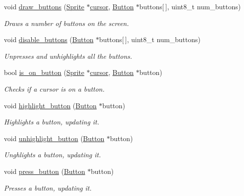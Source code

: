 \begin{DoxyCompactItemize}
void \mbox{\hyperlink{group__sprite_ga73cc8ddf6dbcb83935fabd2443251edd}{draw\+\_\+buttons}} (\mbox{\hyperlink{struct_sprite}{Sprite}} $\ast$\mbox{\hyperlink{pengoo_8c_a3a7ea4305773abf5347bb261a8a5c16b}{cursor}}, \mbox{\hyperlink{struct_button}{Button}} $\ast$buttons\mbox{[}$\,$\mbox{]}, uint8\+\_\+t num\+\_\+buttons)
\begin{DoxyCompactList}\small\item\em Draws a number of buttons on the screen. \end{DoxyCompactList}\item 
void \mbox{\hyperlink{group__sprite_ga7438e498241a820e8b1f4ab63e42c99b}{disable\+\_\+buttons}} (\mbox{\hyperlink{struct_button}{Button}} $\ast$buttons\mbox{[}$\,$\mbox{]}, uint8\+\_\+t num\+\_\+buttons)
\begin{DoxyCompactList}\small\item\em Unpresses and unhighlights all the buttons. \end{DoxyCompactList}\item 
bool \mbox{\hyperlink{group__sprite_ga8fe18a5b062a81b4b99dc62f0643446c}{is\+\_\+on\+\_\+button}} (\mbox{\hyperlink{struct_sprite}{Sprite}} $\ast$\mbox{\hyperlink{pengoo_8c_a3a7ea4305773abf5347bb261a8a5c16b}{cursor}}, \mbox{\hyperlink{struct_button}{Button}} $\ast$button)
\begin{DoxyCompactList}\small\item\em Checks if a cursor is on a button. \end{DoxyCompactList}\item 
void \mbox{\hyperlink{group__sprite_ga1a1688248ec81812ca2c738584e323a4}{highlight\+\_\+button}} (\mbox{\hyperlink{struct_button}{Button}} $\ast$button)
\begin{DoxyCompactList}\small\item\em Highlights a button, updating it. \end{DoxyCompactList}\item 
void \mbox{\hyperlink{group__sprite_gaa28b2a8d13a3ab9e23c3d91691614c81}{unhighlight\+\_\+button}} (\mbox{\hyperlink{struct_button}{Button}} $\ast$button)
\begin{DoxyCompactList}\small\item\em Unghlights a button, updating it. \end{DoxyCompactList}\item 
void \mbox{\hyperlink{group__sprite_ga5c42751a94b0c5695a62506fc2011d80}{press\+\_\+button}} (\mbox{\hyperlink{struct_button}{Button}} $\ast$button)
\begin{DoxyCompactList}\small\item\em Presses a button, updating it. \end{DoxyCompactList}\item 

\end{DoxyCompactItemize}
